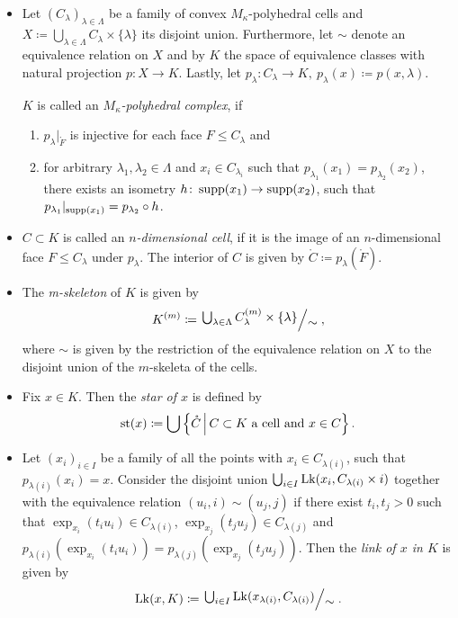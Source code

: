 \begin{defin}\ 
  \begin{itemize}
  \item Let \((C_\lambda)_{\lambda \in \Lambda}\) be a family of convex \(M_\kappa\)-polyhedral cells and \(X \coloneqq \bigcup_{\lambda \in \Lambda} C_\lambda \times \{\lambda\}\) its disjoint union. Furthermore, let \(\sim\) denote an equivalence relation on \(X\) and by \(K\) the space of equivalence classes with natural projection \(p \colon X \to K\). Lastly, let \(p_\lambda \colon C_\lambda \to K,\ p_\lambda(x) \coloneqq p(x, \lambda)\).

    \(K\) is called an \emph{\(M_\kappa\)-polyhedral complex}, if
    \begin{enumerate}
    \item \(p_\lambda |_{\mathring F}\) is injective for each face \(F \leq C_\lambda\) and
    \item for arbitrary \(\lambda_1, \lambda_2 \in \Lambda\) and \(x_i \in C_{\lambda_i}\) such that \(p_{\lambda_1}(x_1) = p_{\lambda_2}(x_2)\), there exists an isometry \(h\colon \operatorname{supp}(x_1) \to \operatorname{supp}(x_2)\), such that \(p_{\lambda_1}|_{\operatorname{supp}(x_1)} = p_{\lambda_2} \circ h\).
    \end{enumerate}
  \item \(C \subset K\) is called an \emph{\(n\)-dimensional cell}, if it is the image of an \(n\)-dimensional face \(F \leq C_\lambda\) under \(p_\lambda\). The interior of \(C\) is given by \(\mathring C \coloneqq p_\lambda(\mathring F)\).
  \item The \emph{m-skeleton} of \(K\) is given by
    \begin{align*}
      K^{(m)} \coloneqq \quot{\bigcup_{\lambda \in \Lambda} C_\lambda^{(m)} \times \{\lambda\}}{\sim},
    \end{align*}
    where \(\sim\) is given by the restriction of the equivalence relation on \(X\) to the disjoint union of the \(m\)-skeleta of the cells.

  \item Fix \(x \in K\). Then the \emph{star of \(x\)} is defined by
    \begin{align*}
      \operatorname{st}(x) \coloneqq \bigcup \left\{\mathring C \,\middle|\, C \subset K \text{ a cell and } x \in C\right\}.
    \end{align*}
  \item Let \((x_i)_{i \in I}\) be a family of all the points with \(x_i \in C_{\lambda(i)}\), such that \(p_{\lambda(i)}(x_i) = x\). Consider the disjoint union \(\bigcup_{i \in I} \operatorname{Lk}(x_i, C_{\lambda(i)} \times {i})\) together with the equivalence relation \((u_i, i) \sim (u_j, j)\) if there exist \(t_i, t_j > 0\) such that \(\exp_{x_i}(t_i u_i) \in C_{\lambda(i)}\), \(\exp_{x_j}(t_j u_j) \in C_{\lambda(j)}\) and \(p_{\lambda(i)}(\exp_{x_i}(t_i u_i)) = p_{\lambda(j)}(\exp_{x_j}(t_j u_j))\). Then the \emph{link of \(x\) in \(K\)} is given by
    \begin{align*}
      \lk(x, K) \coloneqq \quot{\bigcup_{i \in I} \lk(x_{\lambda(i)}, C_{\lambda(i)})}{\sim}.
    \end{align*}
  \end{itemize}
\end{defin}

